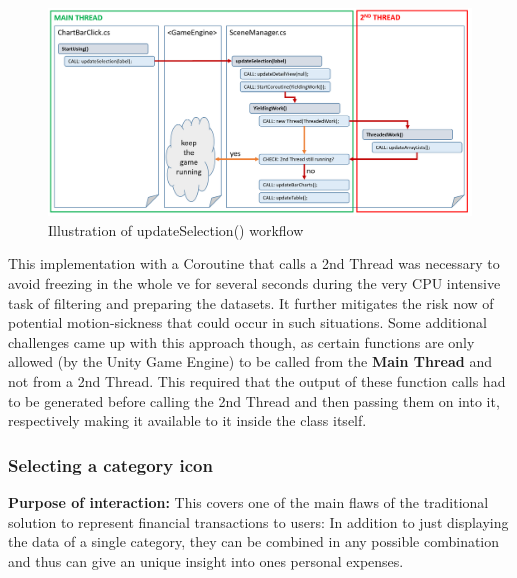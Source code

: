\begin{figure}[h]
	\begin{center}
		\includegraphics[width=15cm]{03_Figures/08_Development/UpdateSelection.png}
		\caption{Illustration of updateSelection() workflow}
		\label{fig:unityupdateselection}
	\end{center}
\end{figure}
This implementation with a Coroutine that calls a 2nd Thread was necessary to avoid freezing in the whole \gls{ve} for several seconds during the very CPU intensive task of filtering and preparing the datasets. It further mitigates the risk now of potential motion-sickness that could occur in such situations. \newline
Some additional challenges came up with this approach though, as certain functions are only allowed (by the Unity Game Engine) to be called from the \textbf{Main Thread} and not from a 2nd Thread. This required that the output of these function calls had to be generated before calling the 2nd Thread and then passing them on into it, respectively making it available to it inside the class itself.


\subsubsection{Selecting a category icon}

\textbf{Purpose of interaction:} This covers one of the main flaws of the traditional solution to represent financial transactions to users: In addition to just displaying the data of a single category, they can be combined in any possible combination  and thus can give an unique insight into ones personal expenses. 


